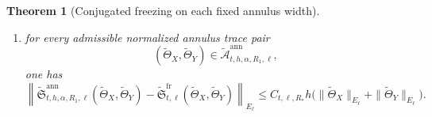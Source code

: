 \documentclass[11pt,a4paper]{amsart}
\theoremstyle{plain}
\newtheorem{theorem}{Theorem}[section]
\theoremstyle{definition}
\theoremstyle{remark}
\begin{document}
\begin{theorem}[Conjugated freezing on each fixed annulus width]
\begin{enumerate}[label=(\roman*)]
\begin{align}
\end{align}
\item for every admissible normalized annulus trace pair
\[
(\widetilde\Theta_X,\widetilde\Theta_Y)\in
\widetilde{\mathcal A}_{t,h,\alpha,R_1,\ell}^{\mathrm{ann}},
\]
one has
\begin{equation}\label{eq:annulus-S-close}
\left\|
\widetilde{\mathfrak S}_{t,h,\alpha,R_1,\ell}^{\mathrm{ann}}
(\widetilde\Theta_X,\widetilde\Theta_Y)
-
\widetilde{\mathfrak S}_{t,\ell}^{\mathrm{fr}}
(\widetilde\Theta_X,\widetilde\Theta_Y)
\right\|_{E_\ell}
\le
C_{t,\ell,R_*}h
\bigl(
\|\widetilde\Theta_X\|_{E_\ell}
+
\|\widetilde\Theta_Y\|_{E_\ell}
\bigr).
\end{equation}
\end{enumerate}
\end{theorem}
\end{document}
